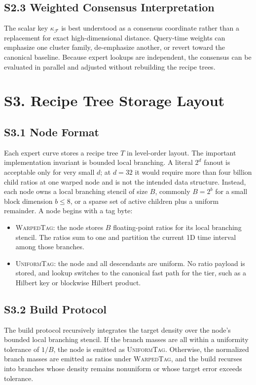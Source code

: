 \documentclass[11pt]{article}
\newcommand{\kappaf}{\kappa_{\mathcal F}}
\begin{document}
\subsection*{S2.3 Weighted Consensus Interpretation}
The scalar key $\kappaf$ is best understood as a consensus coordinate rather than a replacement for exact high-dimensional distance. Query-time weights can emphasize one cluster family, de-emphasize another, or revert toward the canonical baseline. Because expert lookups are independent, the consensus can be evaluated in parallel and adjusted without rebuilding the recipe trees.

\section*{S3. Recipe Tree Storage Layout}
\label{sec:si-recipe-tree}

\subsection*{S3.1 Node Format}
Each expert curve stores a recipe tree $T$ in level-order layout. The important implementation invariant is bounded local branching. A literal $2^d$ fanout is acceptable only for very small $d$; at $d=32$ it would require more than four billion child ratios at one warped node and is not the intended data structure. Instead, each node owns a local branching stencil of size $B$, commonly $B=2^b$ for a small block dimension $b\leq 8$, or a sparse set of active children plus a uniform remainder. A node begins with a tag byte:
\begin{itemize}[leftmargin=1.5em]
    \item \textsc{WarpedTag}: the node stores $B$ floating-point ratios for its local branching stencil. The ratios sum to one and partition the current 1D time interval among those branches.
    \item \textsc{UniformTag}: the node and all descendants are uniform. No ratio payload is stored, and lookup switches to the canonical fast path for the tier, such as a Hilbert key or blockwise Hilbert product.
\end{itemize}

\subsection*{S3.2 Build Protocol}
The build protocol recursively integrates the target density over the node's bounded local branching stencil. If the branch masses are all within a uniformity tolerance of $1/B$, the node is emitted as \textsc{UniformTag}. Otherwise, the normalized branch masses are emitted as ratios under \textsc{WarpedTag}, and the build recurses into branches whose density remains nonuniform or whose target error exceeds tolerance.
\end{document}
